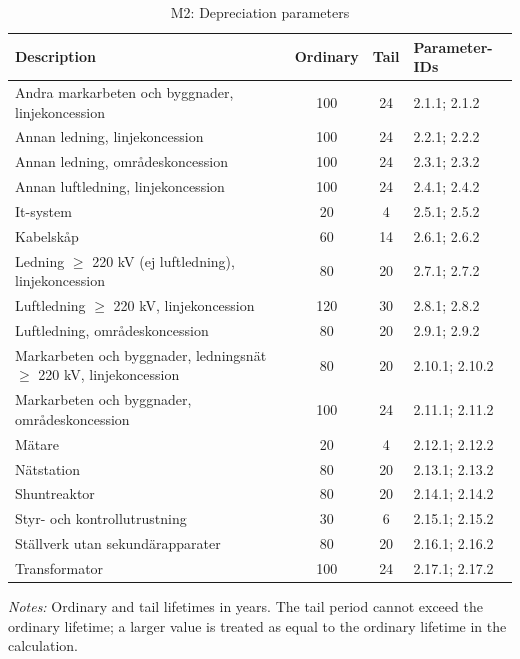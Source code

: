 \begin{table}[H]
\centering
\begin{singlespace}
\footnotesize
\begin{threeparttable}
\caption{M2: Depreciation parameters}
\label{tab:app-m2}
\begin{tabular}{@{}p{8cm}ccl@{}}
\toprule
\textbf{Description} & \textbf{Ordinary} & \textbf{Tail} & \textbf{Parameter-IDs} \\
\midrule
Andra markarbeten och byggnader, linjekoncession & 100 & 24 & 2.1.1; 2.1.2 \\
Annan ledning, linjekoncession & 100 & 24 & 2.2.1; 2.2.2 \\
Annan ledning, områdeskoncession & 100 & 24 & 2.3.1; 2.3.2 \\
Annan luftledning, linjekoncession & 100 & 24 & 2.4.1; 2.4.2 \\
It-system & 20 & 4 & 2.5.1; 2.5.2 \\
Kabelskåp & 60 & 14 & 2.6.1; 2.6.2 \\
Ledning $\geq$ 220 kV (ej luftledning), linjekoncession & 80 & 20 & 2.7.1; 2.7.2 \\
Luftledning $\geq$ 220 kV, linjekoncession & 120 & 30 & 2.8.1; 2.8.2 \\
Luftledning, områdeskoncession & 80 & 20 & 2.9.1; 2.9.2 \\
Markarbeten och byggnader, ledningsnät $\geq$ 220 kV, linjekoncession & 80 & 20 & 2.10.1; 2.10.2 \\
Markarbeten och byggnader, områdeskoncession & 100 & 24 & 2.11.1; 2.11.2 \\
Mätare & 20 & 4 & 2.12.1; 2.12.2 \\
Nätstation & 80 & 20 & 2.13.1; 2.13.2 \\
Shuntreaktor & 80 & 20 & 2.14.1; 2.14.2 \\
Styr- och kontrollutrustning & 30 & 6 & 2.15.1; 2.15.2 \\
Ställverk utan sekundärapparater & 80 & 20 & 2.16.1; 2.16.2 \\
Transformator & 100 & 24 & 2.17.1; 2.17.2 \\
\bottomrule
\end{tabular}
\begin{tablenotes}
\item \textit{Notes:} Ordinary and tail lifetimes in years. The tail period cannot exceed the ordinary lifetime; a larger value is treated as equal to the ordinary lifetime in the calculation.
\end{tablenotes}
\end{threeparttable}
\end{singlespace}
\end{table}


